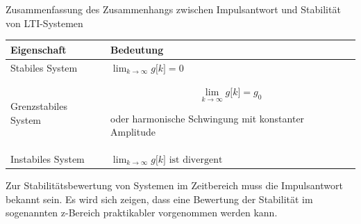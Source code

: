 \begin{summary}{Zusammenfassung des Zusammenhangs zwischen Impulsantwort und Stabilität von LTI-Systemen}
\label{tab:4.7}
\begin{center}
  \begin{tabular}{ll}
    \toprule
    Eigenschaft & Bedeutung \\
    \midrule
    Stabiles System & \(\lim_{k \rightarrow \infty}g\lbrack k\rbrack = 0\) \\
    Grenzstabiles System & 
\[\lim_{k \rightarrow \infty}g\lbrack k\rbrack = g_{0}\]

oder harmonische Schwingung 
mit konstanter Amplitude \\
    Instabiles System & \(\lim_{k \rightarrow \infty}g\lbrack k\rbrack\text{ ist divergent}\) \\
    \bottomrule
  \end{tabular}
\end{center}
\end{summary}

Zur Stabilitätsbewertung von Systemen im Zeitbereich muss die Impulsantwort bekannt sein. Es wird sich zeigen, dass eine Bewertung der Stabilität im sogenannten z-Bereich praktikabler vorgenommen werden kann.
